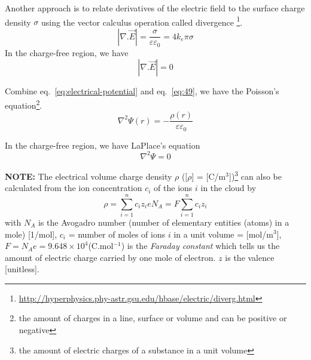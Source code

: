 

Another approach is to relate derivatives of the electric field to the
surface charge density $\sigma$ using the vector calculus operation called
divergence \footnote{\url{http://hyperphysics.phy-astr.gsu.edu/hbase/electric/diverg.html}}. 
\begin{equation}
  \label{eq:49}
  |\nabla . \vec{E}| = \frac{\sigma}{\varepsilon\varepsilon_0} = 4k_e \pi \sigma
\end{equation}
In the charge-free region, we have
\begin{equation}
  \label{eq:51}
  |\nabla . \vec{E}| = 0
\end{equation}

Combine eq.~\eqref{eq:electrical-potential} and eq.~\eqref{eq:49}, we
have the Poisson's
equation\footnote{the amount of charges in a line, surface or volume
  and can be positive or negative}.
\begin{equation}
  \label{eq:50}
  \nabla^2 \Psi(r) = -\frac{\rho(r)}{\varepsilon \varepsilon_0}
\end{equation}

In the charge-free region, we have LaPlace's equation
\begin{equation}
  \label{eq:52}
  \nabla^2 \Psi = 0
\end{equation}


{\bf NOTE:} The electrical volume charge density $\rho$ ([$\rho$] =
[C/m$^3$])\footnote{the amount of electric charges of a substance in a
  unit volume}
can also be calculated from the ion concentration $c_i$ of the ions
$i$ in the cloud by
\begin{equation}
  \label{eq:86}
  \rho = \sum_{i=1}^{n} c_iz_ieN_A = F\sum_{i=1}^{n} c_i z_i
\end{equation}
with $N_A$ is the Avogadro number (number of elementary entities
(atoms) in a mole) [1/mol], $c_i$ = number of moles of ions $i$ in a
unit volume = [mol/m$^3$], $F = N_Ae = 9.648\times 10^4$(C.mol$^{-1}$)
is the {\it Faraday constant} which tells us the amount of electric
charge carried by one mole of electron. $z$ is the valence [unitless].

